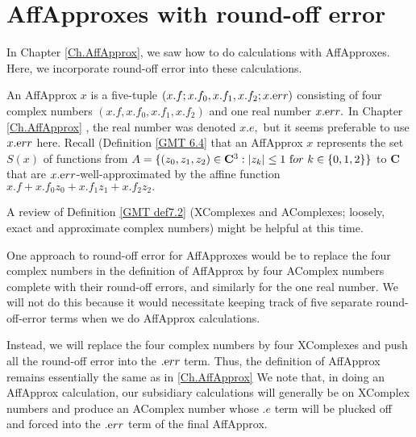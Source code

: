 \chapter{AffApproxes with round-off error}\label{Ch.AffWithEPS} %
 
In Chapter \ref{Ch.AffApprox}, we saw how to do calculations with AffApproxes.  Here, we incorporate round-off error into
these calculations.  

\begin{conventions}\label{GMT 8.1}
An AffApprox $x$ is a five-tuple
$(x.f; x.f_0,x.f_1,x.f_2; x.{\textrm err})$
consisting of four complex numbers $(x.f, x.f_0,x.f_1, x.f_2)$ and one real number $x.{\textrm err}.$  In
	Chapter \ref{Ch.AffApprox}
, the
real number was denoted $x.e,$ but it seems preferable to use $x.{\textrm err}$ here.  Recall (Definition \ref{GMT 6.4}
that an AffApprox $x$ represents the set $S(x)$ of functions from $A = \{(z_0,z_1,z_2) \in \mathbf {C}^3 : |z_k| \le 1 \
{\textrm for} \ k \in \{0,1,2\}\}$ to $\mathbf {C}$ that are $x.{\textrm err}$-well-approximated by the affine function
$x.f + x.f_0 z_0 + x.f_1 z_1 + x.f_2 z_2.$
\end{conventions}

\begin{remarks} \label{GMT 8.2}
A review of Definition \ref{GMT def7.2} (XComplexes and AComplexes; loosely, exact and approximate complex numbers) might be helpful at this time.

One approach to round-off error for AffApproxes would be to replace the four complex numbers in the definition of AffApprox by four AComplex numbers complete with their round-off errors, and similarly for the one real number.  We will not do this because it would necessitate keeping track of five separate round-off-error terms when we do AffApprox calculations.

Instead, we will 
replace the four complex numbers by four XComplexes and push all the round-off error into the $.{\textrm err}$ term.  
Thus, the definition of AffApprox remains 
essentially the same as in
	\ref{Ch.AffApprox}
We note that, in doing an AffApprox calculation, our subsidiary calculations will generally be on XComplex numbers and produce an AComplex number whose $.e$ term will be plucked off and forced into the $.{\textrm err}$ term of the final AffApprox.\end{remarks}

